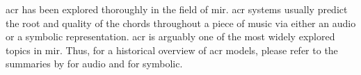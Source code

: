 

\gls{acr} has been explored thoroughly in the field of
\gls{mir}. \gls{acr} systems usually predict the root and
quality of the chords throughout a piece of music via either
an audio or a symbolic representation. \gls{acr} is arguably
one of the most widely explored topics in \gls{mir}. Thus,
for a historical overview of \gls{acr} models, please refer
to the summaries by \textcite{pauwels201920} for audio and
\textcite{ju2021addressing} for symbolic.
